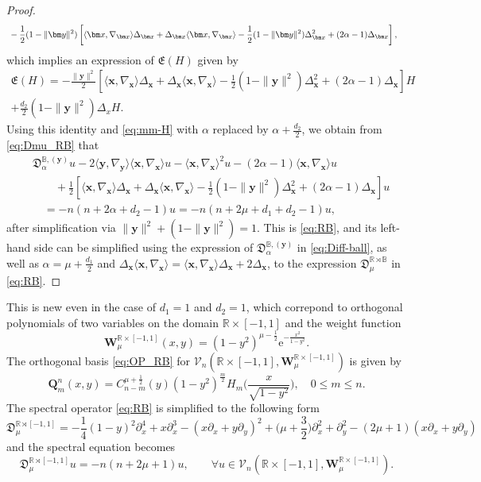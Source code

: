 \documentclass{amsart}
\theoremstyle{remark}
\def\la{{\langle}}
\def\ra{{\rangle}}
\def\e{\mathrm{e}}
\def\fD{{\mathfrak D}}
\def\fE{{\mathfrak E}}
\def\a{{\alpha}}
\def\la{{\langle}}
\def\ra{{\rangle}}
\def\xb{{\bm x}}
\def\yb{{\bm y}}
\def\Qb{{\bm Q}}
\def\Wb{{\bm W}}
\def\CV{{\mathcal V}}
\def\BB{{\mathbb B}}
\def\RR{{\mathbb R}}
\def\f{\frac}
\begin{document}
\begin{proof}
\begin{align}
    &\,  - \frac12 (1-\|\yb\|^2) \left[  \la \xb, \nabla_\xb \ra \Delta_\xb + \Delta_\xb \la \xb, \nabla_\xb\ra 
      - \frac 12(1-\|\yb\|^2) \Delta_\xb^2 + (2\a-1) \Delta_\xb \right], \notag
\end{align} 
which implies an expression of $\fE(H)$ given by 
\begin{align*}
\fE(H) = - \frac{\|\yb\|^2}2  \left[  \la \xb, \nabla_\xb\ra \Delta_\xb + 
    \Delta_\xb  \la \xb, \nabla_\xb\ra - \frac 12(1-\|\yb\|^2) \Delta_\xb ^2 
       + (2\a-1) \Delta_\xb  \right] H  \\
        + \f{d_2}{2} (1-\|\yb\|^2) \Delta_x  H.
\end{align*}
Using this identity and \eqref{eq:mm-H} with $\a$ replaced by $\a+ \frac{d_2}2$, we obtain from \eqref{eq:Dmu_RB} that 
\begin{align*}
& \fD_\a^{\BB, (\yb)} u  -2 \la \yb,\nabla_{\yb} \ra \la \xb,\nabla_{\xb} \ra u - \la \xb,\nabla_\xb \ra^2  u -(2\a-1) \la \xb,\nabla_\xb \ra u\\
&\qquad +  \frac{1}2  \left[  \la \xb, \nabla_\xb\ra \Delta_\xb  + \Delta_\xb  \la \xb, \nabla_\xb\ra - \frac 12(1-\|\yb\|^2) \Delta_\xb ^2 
       + (2\a-1) \Delta_\xb  \right] u \\
      &\quad  =   -n(n+2\a+d_2 -1) u= -n (n+ 2\mu + d_1+d_2-1) u,
\end{align*}
after simplification via $\|\yb\|^2 + (1-\|\yb\|^2) =1$. This is \eqref{eq:RB}, and its left-hand side can be 
simplified using the expression of $\fD_\a^{\BB, (\yb)}$ in \eqref{eq:Diff-ball}, as well as $\a = \mu + \frac{d_1}2$ and 
$\Delta_\xb \la \xb, \nabla_\xb\ra = \la \xb, \nabla_\xb\ra \Delta_\xb + 2 \Delta_\xb$, 
to the expression $\fD_\mu^{\RR \rtimes \BB}$ in \eqref{eq:RB}. 
\end{proof} 
  
This is new even in the case of $d_1 = 1$ and $d_2 =1$, which correpond to orthogonal polynomials of 
two variables on the domain $\RR \times [-1,1]$ and the weight function 
$$
   \Wb_\mu^{\RR\times[-1,1]}(x,y) = (1-y^2)^{\mu-\f12} \e^{ - \frac{x^2}{1-y^2}}.
$$
The orthogonal basis \eqref{eq:OP_RB} for $\CV_n\left(\RR\times [-1,1], \Wb_\mu^{\RR\times[-1,1]}\right)$ is given by
$$ 
  \Qb_m^n(x,y) = C_{n-m}^{\mu + \f12} (y) (1-y^2)^{\frac{m}{2}} H_m \bigg( \frac{x}{\sqrt{1-y^2}} \bigg), \quad 0 \le m \le n.
$$
The spectral operator \eqref{eq:RB} is simplified to the following form
$$
  \fD_{\mu}^{\RR \rtimes [-1,1]} = - \frac14 (1-y)^2 \partial_x^4 + x \partial_x^3 - (x\partial_x + y \partial_y)^2
     + \bigg(\mu + \frac32\bigg) \partial_x^2 +\partial_y^2 - (2\mu+1) \left(x \partial_x+y \partial_y \right)
$$
and the spectral equation becomes
$$
  \fD_{\mu}^{\RR \rtimes [-1,1]} u = - n (n+2\mu+1) u, \qquad \forall u \in \CV_n\left(\RR\times [-1,1], \Wb_\mu^{\RR\times[-1,1]}\right). 
$$
\end{document}
